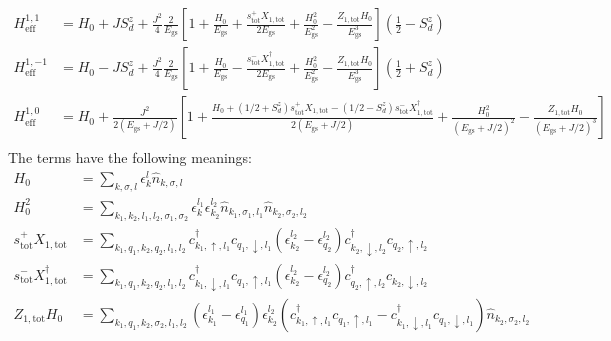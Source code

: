 \documentclass[12pt]{revtex4-2}
\begin{document}
\begin{align}
	H_\text{eff}^{1, 1} &= H_0 + J S_d^z + \frac{J^2}{4}\frac{2}{E_\text{gs}}\left[1 + \frac{H_0}{E_\text{gs}} + \frac{s^+_\text{tot}X_{1,\text{tot}}}{2 E_\text{gs}} + \frac{H_0^2 }{E_\text{gs}^2} - \frac{Z_{1,\text{tot}} H_0}{E_\text{gs}^3}\right] \left(\frac{1}{2} - S_d^z\right) \\
	H_\text{eff}^{1, -1} &= H_0 - J S_d^z + \frac{J^2}{4}\frac{2}{E_\text{gs}}\left[1 + \frac{H_0}{E_\text{gs}}  - \frac{s^-_\text{tot}X^\dagger_{1,\text{tot}}}{2 E_\text{gs}}  + \frac{H_0^2}{E_\text{gs}^2}  - \frac{ Z_{1,\text{tot}} H_0}{E_\text{gs}^3}\right] \left(\frac{1}{2} + S_d^z\right) \\
	H_\text{eff}^{1, 0} &= H_0 + \frac{J^2}{2\left(E_\text{gs} + J/2\right)}\left[1 + \frac{ H_0 + \left(1/2 + S_d^z\right) s^+_\text{tot}X_{1,\text{tot}} - \left(1/2 - S_d^z\right) s^-_\text{tot}X^\dagger_{1,\text{tot}}}{2 \left(E_\text{gs} + J/2\right)} + \frac{H_0^2}{\left(E_\text{gs} + J/2\right)^2} - \frac{Z_{1,\text{tot}} H_0}{\left(E_\text{gs} + J/2\right)^3} \right] \\
\end{align}
The terms have the following meanings:
\begin{align}
	H_0 &= \sum_{k,\sigma,l}\epsilon_k^l \hat n_{k,\sigma,l}\\
	H_0^2 &= \sum_{k_1,k_2,l_1,l_2,\sigma_1,\sigma_2}\epsilon_k^{l_1}\epsilon_{k_2}^{l_2} \hat n_{k_1,\sigma_1,l_1}\hat n_{k_2,\sigma_2,l_2}\\
	s^+_\text{tot}X_{1,\text{tot}} &= \sum_{k_1,q_1,k_2,q_2,l_1,l_2}c^\dagger_{k_1, \uparrow, l_1}c_{q_1, \downarrow, l_1} \left(\epsilon_{k_2}^{l_2} - \epsilon_{q_2}^{l_2}\right) c^\dagger_{k_2, \downarrow, l_2}c_{q_2, \uparrow, l_2}\\
	s^-_\text{tot}X^\dagger_{1,\text{tot}} &= \sum_{k_1,q_1,k_2,q_2,l_1,l_2}c^\dagger_{k_1, \downarrow, l_1}c_{q_1, \uparrow, l_1} \left(\epsilon_{k_2}^{l_2} - \epsilon_{q_2}^{l_2}\right) c^\dagger_{q_2, \uparrow, l_2}c_{k_2, \downarrow, l_2}\\
	Z_{1,\text{tot}} H_0 &= \sum_{k_1,q_1,k_2,\sigma_2,l_1,l_2}\left(\epsilon_{k_1}^{l_1} - \epsilon_{q_1}^{l_1}\right) \epsilon_{k_2}^{l_2} \left(c^\dagger_{k_1, \uparrow, l_1}c_{q_1, \uparrow, l_1} - c^\dagger_{k_1, \downarrow, l_1}c_{q_1, \downarrow, l_1}\right) \hat n_{k_2,\sigma_2,l_2}\\
\end{align}
\end{document}
